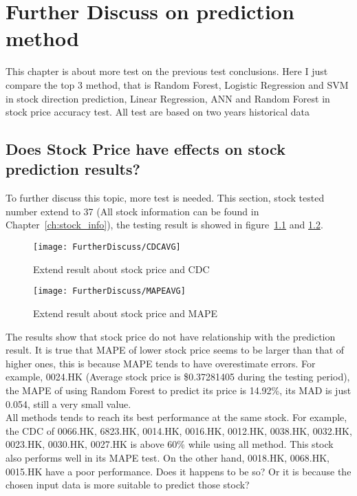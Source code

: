 \chapter{Further Discuss on prediction method}
\label{ch:futuerDiscuss}


This chapter is about more test on the previous test conclusions. Here I just compare the top 3 method, that is Random Forest, Logistic Regression and SVM in stock direction prediction, Linear Regression, ANN and Random Forest in stock price accuracy test. All test are based on two years historical data

\section{Does Stock Price have effects on stock prediction results?}
\label{sec:priceInfluence}
To further discuss this topic, more test is needed. This section, stock tested number extend to 37 (All stock information can be found in Chapter~\ref{ch:stock_info}), the testing result is showed in figure~\ref{fg:furtherCDC} and \ref{fg:furtherMAPE}. 


\begin{figure}[h]
	\centering
	\texttt{[image: FurtherDiscuss/CDCAVG]}
	\caption{Extend result about stock price and CDC}
	\label{fg:furtherCDC}
\end{figure}


\begin{figure}[h]
	\centering
	\texttt{[image: FurtherDiscuss/MAPEAVG]}
	\caption{Extend result about stock price and MAPE}
	\label{fg:furtherMAPE}
\end{figure}
\clearpage

The results show that stock price do not have relationship with the prediction result. It is true that MAPE of lower stock price seems to be larger than that of higher ones, this is because MAPE tends to have overestimate errors. For example, 0024.HK (Average stock price is \$0.37281405 during the testing period), the MAPE of using Random Forest to predict its price is 14.92\%, its MAD is just 0.054, still a very small value.\\


All methods tends to reach its best performance at the same stock. For example, the CDC of 0066.HK, 6823.HK, 0014.HK, 0016.HK, 0012.HK, 0038.HK, 0032.HK, 0023.HK, 0030.HK, 0027.HK is above 60\% while using all method. This stock also performs well in its MAPE test. On the other hand, 0018.HK, 0068.HK, 0015.HK have a poor performance. Does it happens to be so? Or it is because the chosen input data is more suitable to predict those stock?


